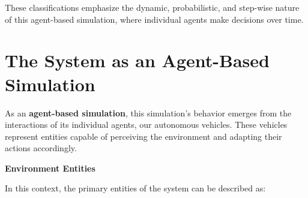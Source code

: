 These classifications emphasize the dynamic, probabilistic, and step-wise nature of this agent-based simulation, where individual agents make decisions over time.

\section{The System as an Agent-Based Simulation}

As an \textbf{agent-based simulation}, this simulation's behavior emerges from the interactions of its individual agents, our autonomous vehicles. These vehicles represent entities capable of perceiving the environment and adapting their actions accordingly.

\textbf{Environment Entities}

In this context, the primary entities of the system can be described as:

